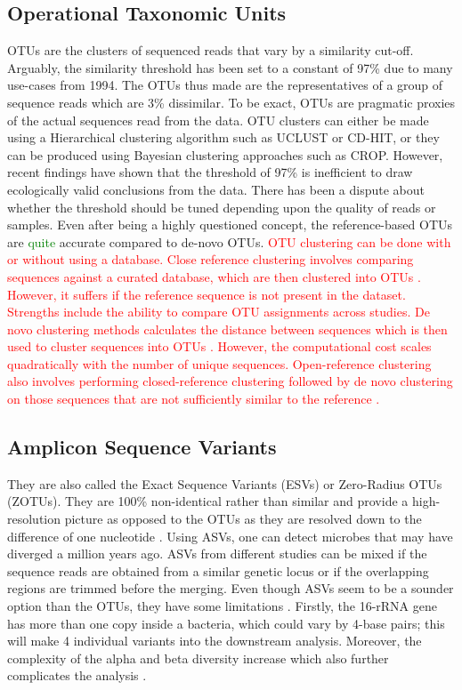 \subsection{Operational Taxonomic Units}
OTUs are the clusters of sequenced reads that vary by a similarity cut-off. Arguably, the similarity threshold has been set to a constant of 97\% due to many use-cases from 1994. The OTUs thus made are the representatives of a group of sequence reads which are 3\% dissimilar. To be exact, OTUs are pragmatic proxies of the actual sequences read from the data. OTU clusters can either be made using a Hierarchical clustering algorithm such as UCLUST or CD-HIT, or they can be produced using Bayesian clustering approaches such as CROP. However, recent findings have shown that the threshold of 97\% is inefficient to draw ecologically valid conclusions from the data. There has been a dispute about whether the threshold should be tuned depending upon the quality of reads or samples. Even after being a highly questioned concept, the reference-based OTUs are \textcolor{green}{quite} accurate compared to de-novo OTUs. \textcolor{red}{OTU clustering can be done with or without using a database. Close reference clustering involves comparing sequences against a curated database, which are then clustered into OTUs \cite{ref15}. However, it suffers if the reference sequence is not present in the dataset. Strengths include the ability to compare OTU assignments across studies. De novo clustering methods calculates the distance between sequences which is then used to cluster sequences into OTUs \cite{ref15}. However, the computational cost scales quadratically with the number of unique sequences. Open-reference clustering also involves performing closed-reference clustering followed by de novo clustering on those sequences that are not sufficiently similar to the reference \cite{ref15}.}

\subsection{Amplicon Sequence Variants}
They are also called the Exact Sequence Variants (ESVs) or Zero-Radius OTUs (ZOTUs). They are 100\% non-identical rather than similar and provide a high-resolution picture as opposed to the OTUs as they are resolved down to the difference of one nucleotide \cite{ref16}. Using ASVs, one can detect microbes that may have diverged a million years ago. ASVs from different studies can be mixed if the sequence reads are obtained from a similar genetic locus or if the overlapping regions are trimmed before the merging. Even though ASVs seem to be a sounder option than the OTUs, they have some limitations \cite{ref16}. Firstly, the 16-rRNA gene has more than one copy inside a bacteria, which could vary by 4-base pairs; this will make 4 individual variants into the downstream analysis. Moreover, the complexity of the alpha and beta diversity increase which also further complicates the analysis \cite{ref16}.